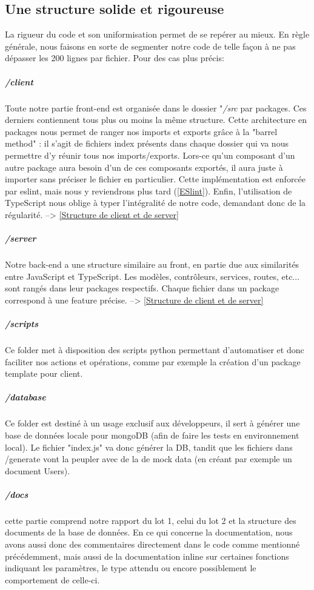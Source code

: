 \subsection{Une structure solide et rigoureuse}

La rigueur du code et son uniformisation permet de se repérer au mieux. En règle générale, nous faisons en sorte de segmenter notre code de telle façon à ne pas dépasser les 200 lignes par fichier. Pour des cas plus précis:

\subparagraph{/client} Toute notre partie front-end est organisée dans le dossier "\textit{/src} par packages. Ces derniers contiennent tous plus ou moins la même structure.
Cette architecture en packages nous permet de ranger nos imports et exports grâce à la "barrel method" : il s'agit de fichiers index présents dans chaque dossier qui va nous permettre d'y réunir tous nos imports/exports. Lors-ce qu'un composant d'un autre package aura besoin d'un de ces composants exportés, il aura juste à importer sans préciser le fichier en particulier. Cette implémentation est enforcée par eslint, mais nous y reviendrons plus tard (\ref{ESlint}). Enfin, l'utilisation de TypeScript nous oblige à typer l'intégralité de notre code, demandant donc de la régularité. --> \ref{Structure de client et de server}

\subparagraph{/server} Notre back-end a une structure similaire au front, en partie due aux similarités entre JavaScript et TypeScript. Les modèles, contrôleurs, services, routes, etc... sont rangés dans leur packages respectifs. Chaque fichier dans un package correspond à une feature précise. --> \ref{Structure de client et de server}

\subparagraph{/scripts} Ce folder met à disposition des scripts python permettant d'automatiser et donc faciliter nos actions et opérations, comme par exemple la création d'un package template pour client.

\subparagraph{/database} Ce folder est destiné à un usage exclusif aux développeurs, il sert à générer une base de données locale pour mongoDB (afin de faire les tests en environnement local).
Le fichier "index.js" va donc générer la DB, tandit que les fichiers dans /generate vont la peupler avec de la de mock data (en créant par exemple un document Users).

\subparagraph{/docs}
cette partie comprend notre rapport du lot 1, celui du lot 2 et la structure des documents de la base de données. En ce qui concerne la documentation, nous avons aussi donc des commentaires directement dans le code comme mentionné précédemment, mais aussi de la documentation inline sur certaines fonctions indiquant les paramètres, le type attendu ou encore possiblement le comportement de celle-ci.

